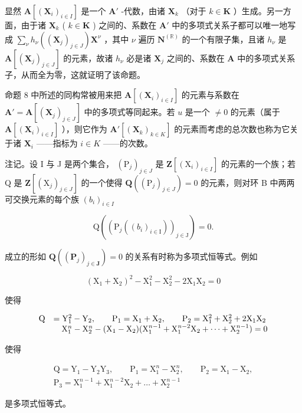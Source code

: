 显然 \(\mathbf{A}[(\mathbf{X}_i)_{i\in I}]\) 是一个 \(\mathbf{A}'\) -代数，由诸 \(\mathbf{X}_k\) （对于 \(k\in \mathbf{K}\) ）生成。另一方面，由于诸 \(\mathbf{X}_k\) ( \(k\in \mathbf{K}\) ) 之间的、系数在 \(\mathbf{A}'\) 中的多项式关系子都可以唯一地写成 \(\sum_{\nu}h_{\nu}((\mathbf{X}_j)_{j\in J})\mathbf{X}^{\nu}\) ，其中 \(\nu\) 遍历 \(\mathbf{N}^{(\mathbb{R})}\) 的一个有限子集，且诸 \(h_\nu\) 是 \(\mathbf{A}[(\mathbf{X}_j)_{j\in J}]\) 的元素，故诸 \(h_\nu\) 必是诸 \(\mathbf{X}_j\) 之间的、系数在 \(\mathbf{A}\) 中的多项式关系子，从而全为零，这就证明了该命题。

命题 8 中所述的同构常被用来把 \(\mathbf{A}[(\mathbf{X}_i)_{i\in I}]\) 的元素与系数在 \(\mathbf{A}' = \mathbf{A}[(\mathbf{X}_j)_{j\in J}]\) 中的多项式等同起来。若 \(u\) 是一个 \(\neq 0\) 的元素（属于 \(\mathbf{A}[(\mathbf{X}_i)_{i\in I}]\) ），则它作为 \(\mathbf{A}'[(\mathbf{X}_k)_{k\in K}]\) 的元素而考虑的总次数也称为它关于诸 \(\mathbf{X}_i\) ——指标为 \(i\in K\) ——的次数。

注记。设 I 与 J 是两个集合， \((\mathrm{P}_{j})_{j\in J}\) 是 \(\mathbf{Z}[(\mathrm{X}_{i})_{i\in I}]\) 的元素的一个族；若 Q 是 \(\mathbf{Z}[(\mathrm{X}_{j})_{j\in J}]\) 的一个使得 \(\mathbf{Q}((\mathrm{P}_{j})_{j\in J})=0\) 的元素，则对环 B 中两两可交换元素的每个族 \((b_{i})_{i\in I}\)

\[
\mathrm{Q} ((\mathrm{P} _ {j} ((b _ {i}) _ {i \in \mathrm{I}})) _ {j \in \mathrm{J}}) = 0.
\]

成立的形如 \(\mathbf{Q}((\mathbf{P}_{j})_{j\in\mathbf{J}})=0\) 的关系有时称为多项式恒等式。例如

\[
\left(\mathrm{X} _ {1} + \mathrm{X} _ {2}\right) ^ {2} - \mathrm{X} _ {1} ^ {2} - \mathrm{X} _ {2} ^ {2} - 2 \mathrm{X} _ {1} \mathrm{X} _ {2} = 0
\]

使得

\[
\begin{array}{r l} \mathrm{Q} & = \mathrm{Y} _ {1} ^ {2} - \mathrm{Y} _ {2}, \qquad \mathrm{P} _ {1} = \mathrm{X} _ {1} + \mathrm{X} _ {2}, \qquad \mathrm{P} _ {2} = \mathrm{X} _ {1} ^ {2} + \mathrm{X} _ {2} ^ {2} + 2 \mathrm{X} _ {1} \mathrm{X} _ {2} \\ & \quad \mathrm{X} _ {1} ^ {n} - \mathrm{X} _ {2} ^ {n} - (\mathrm{X} _ {1} - \mathrm{X} _ {2}) (\mathrm{X} _ {1} ^ {n - 1} + \mathrm{X} _ {1} ^ {n - 2} \mathrm{X} _ {2} + \dots + \mathrm{X} _ {2} ^ {n - 1}) = 0 \end{array}
\]

使得

\[
\begin{array}{c} \mathrm{Q} = \mathrm{Y} _ {1} - \mathrm{Y} _ {2} \mathrm{Y} _ {3}, \qquad \mathrm{P} _ {1} = \mathrm{X} _ {1} ^ {n} - \mathrm{X} _ {2} ^ {n}, \qquad \mathrm{P} _ {2} = \mathrm{X} _ {1} - \mathrm{X} _ {2}, \\ \mathrm{P} _ {3} = \mathrm{X} _ {1} ^ {n - 1} + \mathrm{X} _ {1} ^ {n - 2} \mathrm{X} _ {2} + \dots + \mathrm{X} _ {2} ^ {n - 1} \end{array}
\]

是多项式恒等式。

